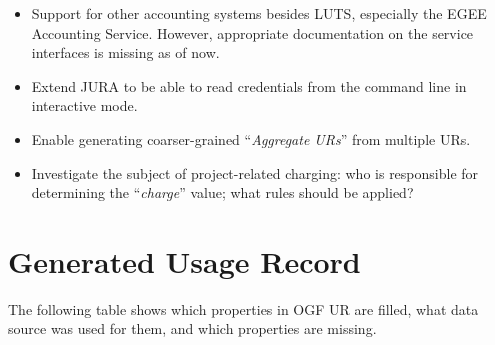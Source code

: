 \documentclass{article}                            %
\begin{document}
\begin{itemize}
\item Support for other accounting systems besides LUTS, especially
  the EGEE Accounting Service. However, appropriate documentation on
  the service interfaces is missing as of now.
\item Extend JURA to be able to read credentials from the command line
  in interactive mode.
\item Enable generating coarser-grained ``\textit{Aggregate URs}''
  from multiple URs.
\item Investigate the subject of project-related charging: who is
  responsible for determining the ``\textit{charge}'' value; what rules should
  be applied?
\end{itemize}






\newpage
\appendix

\section{Generated Usage Record}
\label{log2ur}
The following table shows which properties in OGF UR\cite{ur} are
filled, what data source was used for them, and which properties are
missing.

\end{document}

